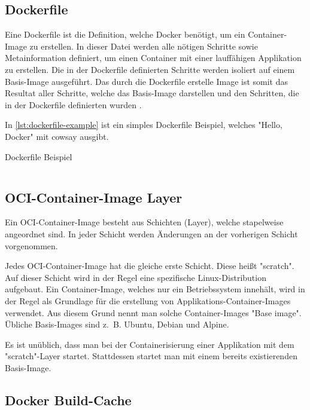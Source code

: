 \subsection{Dockerfile}

Eine Dockerfile ist die Definition, welche Docker benötigt, um ein Container-Image zu erstellen. In dieser Datei werden alle nötigen Schritte sowie Metainformation definiert, um einen Container mit einer lauffähigen Applikation zu erstellen. Die in der Dockerfile definierten Schritte werden isoliert auf einem Basis-Image ausgeführt. Das durch die Dockerfile erstelle Image ist somit das Resultat aller Schritte, welche das Basis-Image darstellen und den Schritten, die in der Dockerfile definierten wurden \cite{dockerDockerfileOverview}.

In \cref{lst:dockerfile-example} ist ein simples Dockerfile Beispiel, welches "Hello, Docker" mit cowsay ausgibt.

\begin{listing}[H]
    \caption{Dockerfile Beispiel}
    \label{lst:dockerfile-example}
    \inputminted{docker}{./code-examples/Dockerfile.example}
\end{listing}


\subsection{OCI-Container-Image Layer}

Ein OCI-Container-Image besteht aus Schichten (Layer), welche stapelweise angeordnet sind. In jeder Schicht werden Änderungen an der vorherigen Schicht vorgenommen. 

Jedes OCI-Container-Image hat die gleiche erste Schicht. Diese heißt "scratch". Auf dieser Schicht wird in der Regel eine spezifische Linux-Distribution aufgebaut. Ein Container-Image, welches nur ein Betriebssystem innehält, wird in der Regel als Grundlage für die erstellung von Applikations-Container-Images verwendet. Aus diesem Grund nennt man solche Container-Images "Base image". Übliche Basis-Images sind z. B. Ubuntu, Debian und Alpine. 

Es ist unüblich, dass man bei der Containerisierung einer Applikation mit dem "scratch"-Layer startet. Stattdessen startet man mit einem bereits existierenden Basis-Image.

\subsection{Docker Build-Cache}


